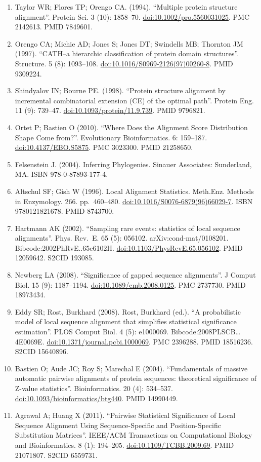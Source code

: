 \documentclass[
]{book}
\begin{document}
\begin{enumerate}
\item
  Taylor WR; Flores TP; Orengo CA. (1994). ``Multiple protein structure alignment''. Protein Sci. 3 (10): 1858--70. \url{doi:10.1002/pro.5560031025}. PMC 2142613. PMID 7849601.
\item
  Orengo CA; Michie AD; Jones S; Jones DT; Swindells MB; Thornton JM (1997). ``CATH--a hierarchic classification of protein domain structures''. Structure. 5 (8): 1093--108. \url{doi:10.1016/S0969-2126(97)00260-8}. PMID 9309224.
\item
  Shindyalov IN; Bourne PE. (1998). ``Protein structure alignment by incremental combinatorial extension (CE) of the optimal path''. Protein Eng. 11 (9): 739--47. \url{doi:10.1093/protein/11.9.739}. PMID 9796821.
\item
  Ortet P; Bastien O (2010). ``Where Does the Alignment Score Distribution Shape Come from?''. Evolutionary Bioinformatics. 6: 159--187. \url{doi:10.4137/EBO.S5875}. PMC 3023300. PMID 21258650.
\item
  Felsenstein J. (2004). Inferring Phylogenies. Sinauer Associates: Sunderland, MA. ISBN 978-0-87893-177-4.
\item
  Altschul SF; Gish W (1996). Local Alignment Statistics. Meth.Enz. Methods in Enzymology. 266. pp.~460--480. \url{doi:10.1016/S0076-6879(96)66029-7}. ISBN 9780121821678. PMID 8743700.
\item
  Hartmann AK (2002). ``Sampling rare events: statistics of local sequence alignments''. Phys. Rev.~E. 65 (5): 056102. arXiv:cond-mat/0108201. Bibcode:2002PhRvE..65e6102H. \url{doi:10.1103/PhysRevE.65.056102}. PMID 12059642. S2CID 193085.
\item
  Newberg LA (2008). ``Significance of gapped sequence alignments''. J Comput Biol. 15 (9): 1187--1194. \url{doi:10.1089/cmb.2008.0125}. PMC 2737730. PMID 18973434.
\item
  Eddy SR; Rost, Burkhard (2008). Rost, Burkhard (ed.). ``A probabilistic model of local sequence alignment that simplifies statistical significance estimation''. PLOS Comput Biol. 4 (5): e1000069. Bibcode:2008PLSCB\ldots4E0069E. \url{doi:10.1371/journal.pcbi.1000069}. PMC 2396288. PMID 18516236. S2CID 15640896.
\item
  Bastien O; Aude JC; Roy S; Marechal E (2004). ``Fundamentals of massive automatic pairwise alignments of protein sequences: theoretical significance of Z-value statistics''. Bioinformatics. 20 (4): 534--537. \url{doi:10.1093/bioinformatics/btg440}. PMID 14990449.
\item
  Agrawal A; Huang X (2011). ``Pairwise Statistical Significance of Local Sequence Alignment Using Sequence-Specific and Position-Specific Substitution Matrices''. IEEE/ACM Transactions on Computational Biology and Bioinformatics. 8 (1): 194--205. \url{doi:10.1109/TCBB.2009.69}. PMID 21071807. S2CID 6559731.

\end{enumerate}
\end{document}
